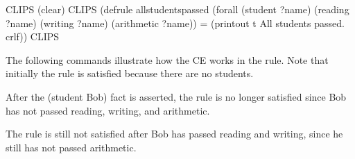 \documentclass[letterpaper,10pt,english]{sphinxmanual}
\begin{document}
\begin{sphinxVerbatim}[commandchars=\\\{\}]
CLIPS\PYGZgt{} (clear)
CLIPS\PYGZgt{}
(defrule all\PYGZhy{}students\PYGZhy{}passed
  (forall (student ?name)
          (reading ?name)
          (writing ?name)
          (arithmetic ?name))
   =\PYGZgt{}
   (printout t \PYGZdq{}All students passed.\PYGZdq{} crlf))
CLIPS\PYGZgt{}
\end{sphinxVerbatim}

The following commands illustrate how the  CE works in the
 rule. Note that initially the
 rule is satisfied because there are no students.

\begin{sphinxVerbatim}[commandchars=\\\{\}]
 
 
  \PYGZbs{}
     
\end{sphinxVerbatim}

After the (student Bob) fact is asserted, the rule is no longer
satisfied since Bob has not passed reading, writing, and arithmetic.

\begin{sphinxVerbatim}[commandchars=\\\{\}]
   
 
\end{sphinxVerbatim}

The rule is still not satisfied after Bob has passed reading and
writing, since he still has not passed arithmetic.

\begin{sphinxVerbatim}[commandchars=\\\{\}]
     
 
\end{sphinxVerbatim}
\end{document}
